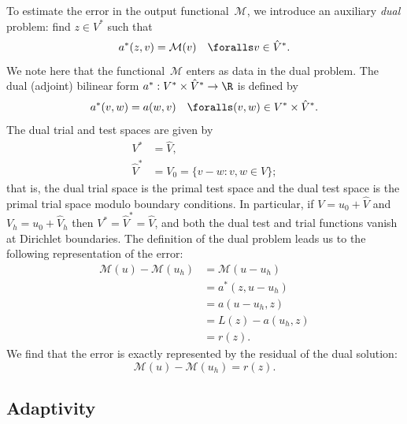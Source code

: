 To estimate the error in the output functional~$\mathcal{M}$, we
introduce an auxiliary \emph{dual} problem: find $z \in V^*$ such that
\begin{equation} \label{eq:varproblem,dual}
  a^*(z, v) = \mathcal{M}(v) \quad \foralls v \in \hat{V}^*.
\end{equation}
We note here that the functional~$\mathcal{M}$ enters as data in the
dual problem. The dual (adjoint) bilinear form $a^* : V^* \times
\hat{V}^* \rightarrow \R$ is defined by
\begin{equation}
  a^*(v, w) = a(w, v) \quad \foralls (v, w) \in V^* \times \hat{V}^*.
\end{equation}
The dual trial and test spaces are given by
\begin{equation}
  \begin{split}
    V^* &= \hat{V}, \\
    \hat{V}^* &= V_0 = \{v - w : v, w \in V\};
  \end{split}
\end{equation}
that is, the dual trial space is the primal test space and the dual
test space is the primal trial space modulo boundary conditions. In
particular, if $V = u_0 + \hat{V}$ and $V_h = u_0 + \hat{V}_h$ then
$V^* = \hat{V}^* = \hat{V}$, and both the dual test and trial
functions vanish at Dirichlet boundaries. The definition of the dual
problem leads us to the following representation of the error:
\begin{equation}
  \begin{split}
    \mathcal{M}(u) - \mathcal{M}(u_h)
    &= \mathcal{M}(u - u_h) \\
    &= a^*(z, u - u_h) \\
    &= a(u - u_h, z) \\
    &= L(z) - a(u_h, z) \\
    &= r(z).
  \end{split}
\end{equation}
We find that the error is exactly represented by the residual of the
dual solution:
\begin{equation} \label{eq:aposteriori,dual}
  \mathcal{M}(u) - \mathcal{M}(u_h) = r(z).
\end{equation}

\subsection{Adaptivity}

